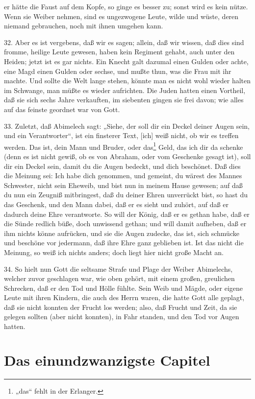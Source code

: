 er hätte die Faust auf dem Kopfe, so ginge es besser zu; sonst wird es kein nütze. Wenn sie Weiber nehmen, sind es ungezwogene Leute, wilde und wüste, deren niemand gebrauchen, noch mit ihnen umgehen kann.

32. Aber es ist vergebens, daß wir es sagen; allein, daß wir wissen, daß dies sind fromme, heilige Leute gewesen, haben kein Regiment gehabt, auch unter den Heiden; jetzt ist es gar nichts. Ein Knecht galt dazumal einen Gulden oder achte, eine Magd einen Gulden oder sechse, und mußte thun, was die Frau mit ihr machte. Und sollte die Welt lange stehen, könnte man es nicht wohl wieder halten im Schwange, man müßte es wieder aufrichten. Die Juden hatten einen Vortheil, daß sie sich sechs Jahre verkauften, im siebenten gingen sie frei davon; wie alles auf das feinste geordnet war von Gott.

33. Zuletzt, daß Abimelech sagt: „Siehe, der soll dir ein Deckel deiner Augen sein, und ein Verantworter“, ist ein finsterer Text, [ich] weiß nicht, ob wir es treffen werden. Das ist, dein Mann und Bruder, oder das\footnote{„das“ fehlt in der Erlanger.} Geld, das ich dir da schenke (denn es ist nicht gewiß, ob es von Abraham, oder vom Geschenke gesagt ist), soll dir ein Deckel sein, damit du die Augen bedeckt, und dich beschönet. Daß dies die Meinung sei: Ich habe dich genommen, und gemeint, du wärest des Mannes Schwester, nicht sein Eheweib, und bist nun in meinem Hause gewesen; auf daß du nun ein Zeugniß mitbringest, daß du deiner Ehren unverrückt bist, so hast du das Geschenk, und den Mann dabei, daß er es sieht und zuhört, auf daß er dadurch deine Ehre verantworte. So will der König, daß er es gethan habe, daß er die Sünde redlich büße, doch unwissend gethan; und will damit aufheben, daß er ihm nichts könne aufrücken, und sie die Augen zudecke, das ist, sich schmücke und beschöne vor jedermann, daß ihre Ehre ganz geblieben ist. Ist das nicht die Meinung, so weiß ich nichts anders; doch liegt hier nicht große Macht an.

34. So hielt nun Gott die seltsame Strafe und Plage der Weiber Abimelechs, welcher zuvor geschlagen war, wie oben gehört, mit einem großen, greulichen Schrecken, daß er den Tod und Hölle fühlte. Sein Weib und Mägde, oder eigene Leute mit ihren Kindern, die auch des Herrn waren, die hatte Gott alle geplagt, daß sie nicht konnten der Frucht los werden; also, daß Frucht und Zeit, da sie gelegen sollten (aber nicht konnten), in Fahr standen, und den Tod vor Augen hatten.

\section{Das einundzwanzigste Capitel}

